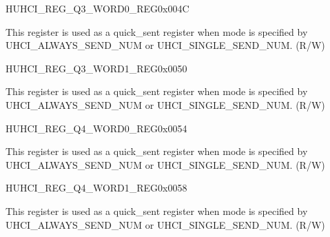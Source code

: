 \begin{register}{H}{UHCI\_REG\_Q3\_WORD0\_REG}{0x004C}\label{regdesc:UHCIREGQ3WORD0REG}
%
\regnewline%
\begin{regdesc}\begin{reglist}
\label{fielddesc:UHCISENDQ3WORD0}\item [UHCI\_SEND\_Q3\_WORD0] This register is used as a quick\_sent register when mode is specified by UHCI\_ALWAYS\_SEND\_NUM or UHCI\_SINGLE\_SEND\_NUM. (R/W)
\end{reglist}\end{regdesc}
\end{register}


\begin{register}{H}{UHCI\_REG\_Q3\_WORD1\_REG}{0x0050}\label{regdesc:UHCIREGQ3WORD1REG}
%
\regnewline%
\begin{regdesc}\begin{reglist}
\label{fielddesc:UHCISENDQ3WORD1}\item [UHCI\_SEND\_Q3\_WORD1] This register is used as a quick\_sent register when mode is specified by UHCI\_ALWAYS\_SEND\_NUM or UHCI\_SINGLE\_SEND\_NUM. (R/W)
\end{reglist}\end{regdesc}
\end{register}


\begin{register}{H}{UHCI\_REG\_Q4\_WORD0\_REG}{0x0054}\label{regdesc:UHCIREGQ4WORD0REG}
%
\regnewline%
\begin{regdesc}\begin{reglist}
\label{fielddesc:UHCISENDQ4WORD0}\item [UHCI\_SEND\_Q4\_WORD0] This register is used as a quick\_sent register when mode is specified by UHCI\_ALWAYS\_SEND\_NUM or UHCI\_SINGLE\_SEND\_NUM. (R/W)
\end{reglist}\end{regdesc}
\end{register}


\begin{register}{H}{UHCI\_REG\_Q4\_WORD1\_REG}{0x0058}\label{regdesc:UHCIREGQ4WORD1REG}
%
\regnewline%
\begin{regdesc}\begin{reglist}
\label{fielddesc:UHCISENDQ4WORD1}\item [UHCI\_SEND\_Q4\_WORD1] This register is used as a quick\_sent register when mode is specified by UHCI\_ALWAYS\_SEND\_NUM or UHCI\_SINGLE\_SEND\_NUM. (R/W)
\end{reglist}\end{regdesc}
\end{register}


